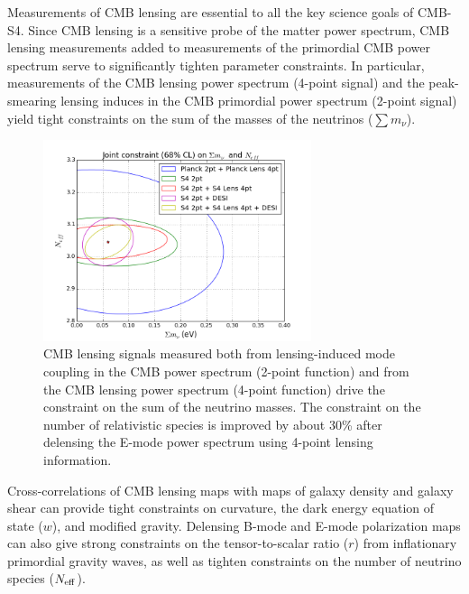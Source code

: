 Measurements of CMB lensing are essential to all the key science goals of CMB-S4.  Since CMB lensing is a sensitive probe of the matter power spectrum, CMB lensing measurements added to measurements of the primordial CMB power spectrum serve to significantly tighten parameter constraints.  In particular, measurements of the CMB lensing power spectrum (4-point signal) and the peak-smearing lensing induces in the CMB primordial power spectrum (2-point signal) yield tight constraints on the sum of the masses of the neutrinos ($\sum {m_\nu}$).  
\vspace{0.3cm}
\begin{figure}[htbp]
\centering
\includegraphics[width=0.7\textwidth]{CMBLensing/Neff_Mnu.png}
\caption{CMB lensing signals measured both from lensing-induced mode coupling in the CMB power spectrum (2-point function) and from the CMB lensing power spectrum (4-point function) drive the constraint on the sum of the neutrino masses.  The constraint on the number of relativistic species is improved by about 30\% after delensing the E-mode power spectrum using 4-point lensing information.}
\label{neutrinos}
\end{figure}
Cross-correlations of CMB lensing maps with maps of galaxy density and galaxy shear can provide tight constraints on curvature, the dark energy equation of state ($w$), and modified gravity.  Delensing B-mode and E-mode polarization maps can also give strong constraints on the tensor-to-scalar ratio ($r$) from inflationary primordial gravity waves, as well as tighten constraints on the number of neutrino species ($N_{\rm{eff}}$).  

